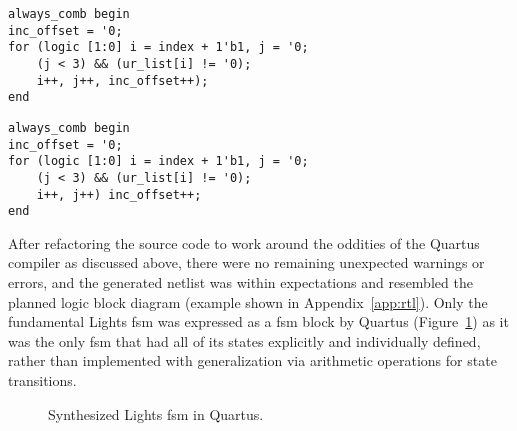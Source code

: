 \begin{listing}[H]
	\begin{verbatim}
always_comb begin
inc_offset = '0;
for (logic [1:0] i = index + 1'b1, j = '0;
    (j < 3) && (ur_list[i] != '0);
    i++, j++, inc_offset++);
end
\end{verbatim}
\end{listing}
\begin{code}
	\begin{verbatim}
always_comb begin
inc_offset = '0;
for (logic [1:0] i = index + 1'b1, j = '0;
    (j < 3) && (ur_list[i] != '0);
    i++, j++) inc_offset++;
end
\end{verbatim}
\end{code}
After refactoring the source code to work around the oddities of the Quartus compiler as discussed above, there were no remaining unexpected warnings or errors, and the generated netlist was within expectations and resembled the planned logic block diagram (example shown in Appendix~\ref{app:rtl}). Only the fundamental Lights \ac{fsm} was expressed as a \ac{fsm} block by Quartus (Figure~\ref{fig:lightsfsmquartus}) as it was the only \ac{fsm} that had all of its states explicitly and individually defined, rather than implemented with generalization via arithmetic operations for state transitions.
\begin{figure}[H]
	\centering
	\caption{Synthesized Lights \acs{fsm} in Quartus.\label{fig:lightsfsmquartus}}
\end{figure}

